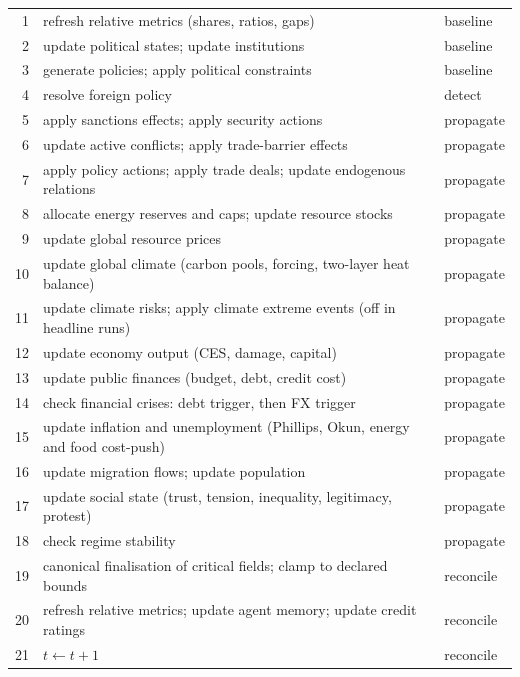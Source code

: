 \documentclass[12pt,a4paper]{article}
\begin{document}
\begin{xltabular}{\linewidth}{@{}r L >{\raggedright\arraybackslash}p{2.1cm}@{}}
1  & refresh relative metrics (shares, ratios, gaps) & baseline \\
2  & update political states; update institutions & baseline \\
3  & generate policies; apply political constraints & baseline \\
4  & resolve foreign policy & detect \\
5  & apply sanctions effects; apply security actions & propagate \\
6  & update active conflicts; apply trade-barrier effects & propagate \\
7  & apply policy actions; apply trade deals; update endogenous relations & propagate \\
8  & allocate energy reserves and caps; update resource stocks & propagate \\
9  & update global resource prices & propagate \\
10 & update global climate (carbon pools, forcing, two-layer heat balance) & propagate \\
11 & update climate risks; apply climate extreme events (off in headline runs) & propagate \\
12 & update economy output (CES, damage, capital) & propagate \\
13 & update public finances (budget, debt, credit cost) & propagate \\
14 & check financial crises: debt trigger, then FX trigger & propagate \\
15 & update inflation and unemployment (Phillips, Okun, energy and food cost-push) & propagate \\
16 & update migration flows; update population & propagate \\
17 & update social state (trust, tension, inequality, legitimacy, protest) & propagate \\
18 & check regime stability & propagate \\
19 & canonical finalisation of critical fields; clamp to declared bounds & reconcile \\
20 & refresh relative metrics; update agent memory; update credit ratings & reconcile \\
21 & $t \leftarrow t+1$ & reconcile \\
\end{xltabular}
\endgroup
\end{document}
